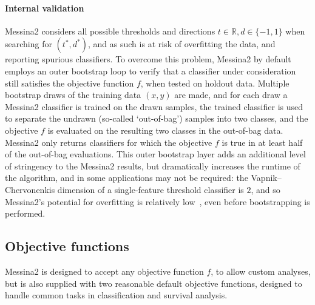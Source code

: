 \documentclass[dissertation.tex]{subfiles}
\begin{document}
\paragraph{Internal validation}
Messina2 considers all possible thresholds and directions $t \in \mathbb{R}, d \in \{-1,1\}$ when searching for $(t^*, d^*)$, and as such is at risk of overfitting the data, and reporting spurious classifiers.  To overcome this problem, Messina2 by default employs an outer bootstrap loop to verify that a classifier under consideration still satisfies the objective function $f$, when tested on holdout data.  Multiple bootstrap draws of the training data $(x, y)$ are made, and for each draw a Messina2 classifier is trained on the drawn samples, the trained classifier is used to separate the undrawn (so-called `out-of-bag') samples into two classes, and the objective $f$ is evaluated on the resulting two classes in the out-of-bag data.  Messina2 only returns classifiers for which the objective $f$ is $\mathrm{true}$ in at least half of the out-of-bag evaluations.  This outer bootstrap layer adds an additional level of stringency to the Messina2 results, but dramatically increases the runtime of the algorithm, and in some applications may not be required: the Vapnik–Chervonenkis dimension of a single-feature threshold classifier is $2$, and so Messina2's potential for overfitting is relatively low~\cite{Vapnik1999}, even before bootstrapping is performed.

\subsection{Objective functions}
Messina2 is designed to accept any objective function $f$, to allow custom analyses, but is also supplied with two reasonable default objective functions, designed to handle common tasks in classification and survival analysis.
\end{document}
